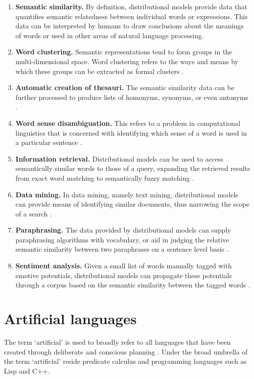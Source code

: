 \documentclass[14pt, a4paper]{extreport}
\begin{document}
\begin{enumerate}
  \item \textbf{Semantic similarity.} By definition, distributional models provide data that quantifies semantic relatedness between individual words or expressions. This data can be interpreted by humans to draw conclusions about the meanings of words or used in other areas of natural language processing.
  \item \textbf{Word clustering.} Semantic representations tend to form groups in the multi-dimensional space. Word clustering refers to the ways and means by which these groups can be extracted as formal clusters \parencite{bekkerman}.
  \item \textbf{Automatic creation of thesauri.} The semantic similarity data can be further processed to produce lists of homonyms, synonyms, or even antonyms \parencite{henestroza}.
  \item \textbf{Word sense disambiguation.} This refers to a problem in computational linguistics that is concerned with identifying which sense of a word is used in a particular sentence \parencite{musto}.
  \item \textbf{Information retrieval.} Distributional models can be used to access semantically similar words to those of a query, expanding the retrieved results from exact word matching to semantically fuzzy matching \parencite{silva}.
  \item \textbf{Data mining.} In data mining, namely text mining, distributional models can provide means of identifying similar documents, thus narrowing the scope of a search \parencite[89]{dalianis}.
  \item \textbf{Paraphrasing.} The data provided by distributional models can supply paraphrasing algorithms with vocabulary, or aid in judging the relative semantic similarity between two paraphrases on a sentence level basis \parencite{desouki}.
  \item \textbf{Sentiment analysis.} Given a small list of words manually tagged with emotive potentials, distributional models can propagate these potentials through a corpus based on the semantic similarity between the tagged words \parencite{alshari}.
\end{enumerate}

  \section{Artificial languages}
The term `artificial' is used to broadly refer to all languages that have been created through deliberate and conscious planning \parencite[41]{stria}. Under the broad umbrella of the term `artificial' reside predicate calculus and programming languages such as Lisp and C++.
\end{document}
